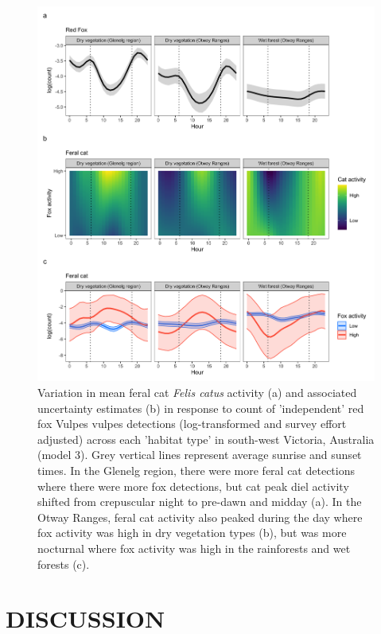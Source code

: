 \documentclass[]{elsarticle} %
\begin{document}
\begin{figure}

{\centering \includegraphics[width=1\linewidth]{../figs/cat_fox_count} 

}

\caption{Variation in mean feral cat \textit{Felis catus} activity (a) and associated uncertainty estimates (b) in response to count of ’independent’ red fox Vulpes vulpes detections (log-transformed and survey effort adjusted) across each ’habitat type’ in south-west Victoria, Australia (model 3). Grey vertical lines represent average sunrise and sunset times. In the Glenelg region, there were more feral cat detections where there were more fox detections, but cat peak diel activity shifted from crepuscular night to pre-dawn and midday (a). In the Otway Ranges, feral cat activity also peaked during the day where fox activity was high in dry vegetation types (b), but was more nocturnal where fox activity was high in the rainforests and wet forests (c).}\label{fig:diel-cat-fox}
\end{figure}

\newpage

\hypertarget{discussion}{%
\section{DISCUSSION}\label{discussion}}
\end{document}
